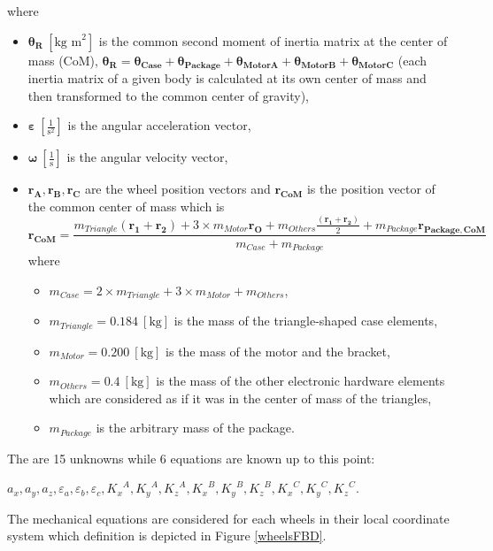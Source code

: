 \documentclass[12pt,english,twoside]{article}
\begin{document}
where \begin{itemize}
	\item $\boldsymbol{\theta_R}~[\text{kg m}^2]$ is the common second moment of inertia matrix at the center of mass (CoM), $\boldsymbol{\theta_R} = \boldsymbol{\theta_{Case}} +\boldsymbol{\theta_{Package}} + \boldsymbol{\theta_{MotorA}} + \boldsymbol{\theta_{MotorB}} + \boldsymbol{\theta_{MotorC}} $ (each inertia matrix of a given body is calculated at its own center of mass and then transformed to the common  center of gravity),
	\item $\boldsymbol{\varepsilon}~[\frac{1}{\text{s}^2}]$ is the angular acceleration  vector,
	\item $\boldsymbol{\omega}~[\frac{1}{\text{s}}]$ is the angular velocity vector,
	\item $\mathbf{r_A},\mathbf{r_B},\mathbf{r_C}$ are the wheel position vectors and $\mathbf{r_{CoM}}$ is the position vector of the common center of mass which is
	\begin{equation}
		\mathbf{r_{CoM}} = 
			\frac{
				m_{Triangle} (\mathbf{r_1}+\mathbf{r_2})		+
				3 \times m_{Motor} \mathbf{r_O}					+
				m_{Others} \frac{(\mathbf{r_1}+\mathbf{r_2})}{2} 			+ 
				m_{Package}
				\mathbf{r_{Package,CoM}}
			}{
				m_{Case}+m_{Package}
		}
	\end{equation}
	where \begin{itemize}
		\item $m_{Case} = 2 \times m_{Triangle} + 3 \times m_{Motor} + m_{Others}$,
		\item $m_{Triangle} = 0.184~[\text{kg}]$ is the mass of the triangle-shaped case elements,
		\item $m_{Motor} = 0.200~[\text{kg}]$ is the mass of the motor and the bracket,
		\item $m_{Others} = 0.4~[\text{kg}]$ is the mass of the other electronic hardware elements which are considered as if it was in the center of mass of the triangles,
		\item $m_{Package}$ is the arbitrary mass of the package.
	\end{itemize}
\end{itemize}
The are 15 unknowns while 6 equations are known up to this point: \begin{center}
	$a_x,a_y,a_z,\varepsilon_a,\varepsilon_b,\varepsilon_c,{K_x}^A,{K_y}^A,{K_z}^A,{K_x}^B,{K_y}^B,{K_z}^B,{K_x}^C,{K_y}^C,{K_z}^C$.
\end{center}
The mechanical equations are considered for each wheels in their local coordinate system which definition is depicted in Figure \ref{wheelsFBD}. 
\end{document}
